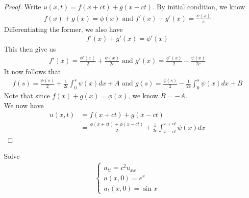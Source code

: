 \documentclass{report}
\begin{document}
\begin{proof}
Write $u(x,t)=f(x+ct)+g(x-ct)$. By initial condition, we know 
\begin{align*}
f(x)+g(x)=\phi (x)\text{ and }f'(x)-g'(x)= \frac{\psi (x)}{c}
\end{align*}
Differentiating the former, we also have 
\begin{align*}
f'(x)+g'(x)=\phi' (x)
\end{align*}
This then give us 
\begin{align*}
f'(x)= \frac{\phi '(x)}{2} + \frac{\psi (x)}{2c}\text{ and }g'(x)= \frac{\phi '(x)}{2}- \frac{\psi (x)}{2c}
\end{align*}
It now follows that 
\begin{align*}
f(s)=\frac{\phi (s)}{2}+ \frac{1}{2c}\int_0^s \psi (x)dx +A \text{ and }g(s)= \frac{\phi (s)}{2} - \frac{1}{2c} \int_0^s \psi (x)dx + B
\end{align*}
Note that since $f(x)+g(x)=\phi (x)$, we know $B=-A$. \\

We now have 
\begin{align*}
u(x,t)&=f(x+ct)+g(x-ct)\\
&=\frac{\phi (x+ct)+\phi (x-ct)}{2}+ \frac{1}{2c} \int^{x+ct}_{x-ct}\psi (x)dx
\end{align*}
\end{proof}
\begin{question}{}{}
Solve 
\begin{align*}
\begin{cases}
  u_{tt}=c^2u_{xx} \\
  u(x,0)=e^x \\
  u_t(x,0)= \sin x 
\end{cases}
\end{align*}
\end{question}
\end{document}
